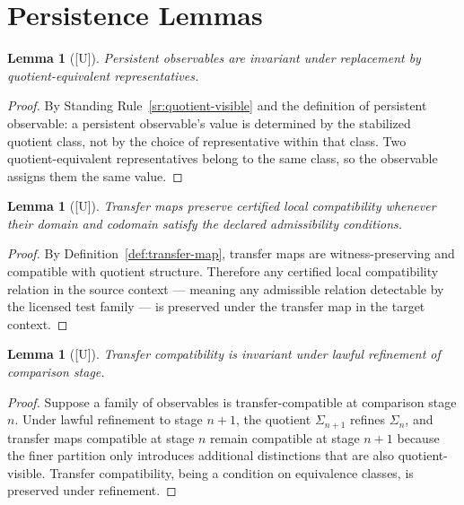 \documentclass[12pt,oneside]{amsbook}
\theoremstyle{plain}
\newtheorem{lemma}[theorem]{Lemma}
\theoremstyle{definition}
\theoremstyle{remark}
\newcommand{\status}[1]{\textup{[#1]}}
\begin{document}
\section{Persistence Lemmas}

\begin{lemma}[\status{U}]\label{lem:persistent-quotient-visible}
Persistent observables are invariant under replacement by
quotient-equivalent representatives.
\end{lemma}

\begin{proof}
By Standing Rule~\ref{sr:quotient-visible} and the definition of
persistent observable: a persistent observable's value is determined
by the stabilized quotient class, not by the choice of representative
within that class.  Two quotient-equivalent representatives belong to
the same class, so the observable assigns them the same value.
\end{proof}

\begin{lemma}[\status{U}]\label{lem:transfer-preserves-compat}
Transfer maps preserve certified local compatibility whenever their
domain and codomain satisfy the declared admissibility conditions.
\end{lemma}

\begin{proof}
By Definition~\ref{def:transfer-map}, transfer maps are
witness-preserving and compatible with quotient structure.  Therefore
any certified local compatibility relation in the source context ---
meaning any admissible relation detectable by the licensed test family
--- is preserved under the transfer map in the target context.
\end{proof}

\begin{lemma}[\status{U}]\label{lem:compat-invariant-refinement}
Transfer compatibility is invariant under lawful refinement of
comparison stage.
\end{lemma}

\begin{proof}
Suppose a family of observables is transfer-compatible at comparison
stage $n$.  Under lawful refinement to stage $n+1$, the quotient
$\Sigma_{n+1}$ refines $\Sigma_n$, and transfer maps compatible at
stage $n$ remain compatible at stage $n+1$ because the finer partition
only introduces additional distinctions that are also quotient-visible.
Transfer compatibility, being a condition on equivalence classes, is
preserved under refinement.
\end{proof}
\end{document}
